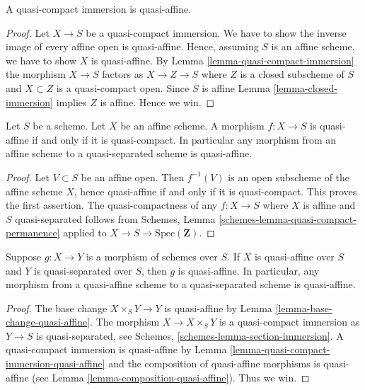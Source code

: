 \begin{lemma}
\label{lemma-quasi-compact-immersion-quasi-affine}
A quasi-compact immersion is quasi-affine.
\end{lemma}

\begin{proof}
Let $X \to S$ be a quasi-compact immersion. We have to show the
inverse image of every affine open is quasi-affine. Hence,
assuming $S$ is an affine scheme, we have to show
$X$ is quasi-affine. By Lemma \ref{lemma-quasi-compact-immersion}
the morphism $X \to S$ factors as $X \to Z \to S$ where $Z$ is a closed
subscheme of $S$ and $X \subset Z$ is a quasi-compact open.
Since $S$ is affine Lemma \ref{lemma-closed-immersion} implies
$Z$ is affine. Hence we win.
\end{proof}

\begin{lemma}
\label{lemma-affine-quasi-affine}
Let $S$ be a scheme. Let $X$ be an affine scheme.
A morphism $f : X \to S$ is quasi-affine if and only if it is quasi-compact.
In particular any morphism from an affine scheme to a quasi-separated
scheme is quasi-affine.
\end{lemma}

\begin{proof}
Let $V \subset S$ be an affine open. Then $f^{-1}(V)$ is an open subscheme
of the affine scheme $X$, hence quasi-affine if and only if it is
quasi-compact. This proves the first assertion. The quasi-compactness of any
$f : X \to S$ where $X$ is affine and $S$ quasi-separated follows from
Schemes, Lemma \ref{schemes-lemma-quasi-compact-permanence}
applied to $X \to S \to \text{Spec}(\mathbf{Z})$.
\end{proof}

\begin{lemma}
\label{lemma-quasi-affine-permanence}
Suppose $g : X \to Y$ is a morphism of schemes over $S$.
If $X$ is quasi-affine over $S$ and $Y$ is quasi-separated over $S$,
then $g$ is quasi-affine. In particular, any morphism from a
quasi-affine scheme to a quasi-separated scheme is quasi-affine.
\end{lemma}

\begin{proof}
The base change $X \times_S Y \to Y$ is quasi-affine by
Lemma \ref{lemma-base-change-quasi-affine}.
The morphism $X \to X \times_S Y$ is
a quasi-compact immersion as $Y \to S$ is quasi-separated, see
Schemes, \ref{schemes-lemma-section-immersion}.
A quasi-compact immersion is quasi-affine by
Lemma \ref{lemma-quasi-compact-immersion-quasi-affine}
and the composition of quasi-affine morphisms is quasi-affine
(see Lemma \ref{lemma-composition-quasi-affine}). Thus we win.
\end{proof}











